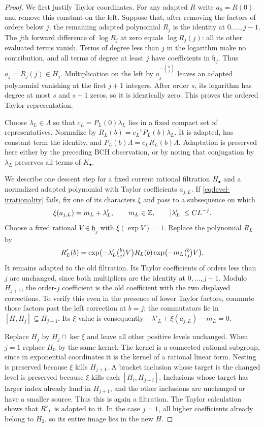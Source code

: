 \begin{proof}
We first justify Taylor coordinates.  For any adapted $R$ write
$a_0=R(0)$ and remove this constant on the left.  Suppose that, after
removing the factors of orders below $j$, the remaining adapted polynomial
$R_j$ is the identity at $0,\ldots,j-1$.  The $j$th forward difference of
$\log R_j$ at zero equals $\log R_j(j)$: all its other evaluated terms
vanish.  Terms of degree less than $j$ in the logarithm make no
contribution, and all terms of degree at least $j$ have coefficients in
$\mathfrak h_j$.  Thus $a_j=R_j(j)\in H_j$.  Multiplication on the left by
$a_j^{-\binom bj}$ leaves an adapted polynomial vanishing at the first
$j+1$ integers.  After order $s$, its logarithm has degree at most $s$
and $s+1$ zeros, so it is identically zero.  This proves the ordered Taylor
representation.

Choose $\lambda_L\in\Lambda$ so that
$c_L=P_L(0)\lambda_L$ lies in a fixed compact set of representatives.
Normalize by
$R_L(b)=c_L^{-1}P_L(b)\lambda_L$.
It is adapted, has constant term the identity, and
$P_L(b)\Lambda=c_LR_L(b)\Lambda$.  Adaptation is preserved here either
by the preceding BCH observation, or by noting that conjugation by
$\lambda_L$ preserves all terms of $K_\bullet$.

We describe one descent step for a fixed current rational filtration
$H_\bullet$ and a normalized adapted polynomial with Taylor coefficients
$a_{j,L}$.  If \eqref{eq:level-irrationality} fails, fix one of its
characters $\xi$ and pass to a subsequence on which
\[
 \xi(a_{j,L})=m_L+\lambda'_L,\qquad
 m_L\in\mathbb Z,\qquad \lvert\lambda'_L\rvert\leq C L^{-j}.
\]
Choose a fixed rational $V\in\mathfrak h_j$ with $\xi(\exp V)=1$.
Replace the polynomial $R_L$ by
\begin{equation}
 R'_L(b)
 =\exp\bigl(-\lambda'_L\tbinom bj V\bigr)
   R_L(b)
   \exp\bigl(-m_L\tbinom bj V\bigr).
 \label{eq:filtration-descent}
\end{equation}
It remains adapted to the old filtration.  Its Taylor coefficients of
orders less than $j$ are unchanged, since both multipliers are the
identity at $0,\ldots,j-1$.  Modulo $H_{j+1}$, the order-$j$ coefficient
is the old coefficient with the two displayed corrections.  To verify this
even in the presence of lower Taylor factors, commute those factors past
the left correction at $b=j$; the commutators lie in
$[H,H_j]\subseteq H_{j+1}$.  Its $\xi$-value is consequently
$-\lambda'_L+\xi(a_{j,L})-m_L=0$.

Replace $H_j$ by $H_j\cap\ker\xi$ and leave all other positive levels
unchanged.  When $j=1$ replace $H_0$ by the same kernel.  The kernel is a
connected rational subgroup, since in exponential coordinates it is the
kernel of a rational linear form.  Nesting is preserved because $\xi$
kills $H_{j+1}$.  A bracket inclusion whose target is the changed level
is preserved because $\xi$ kills each $[H_i,H_{j-i}]$.  Inclusions whose
target has larger index already land in $H_{j+1}$, and the other
inclusions are unchanged or have a smaller source.  Thus this is again a
filtration.  The Taylor calculation shows that $R'_L$ is adapted to it.
In the case $j=1$, all higher coefficients already belong to $H_2$,
so its entire image lies in the new $H$.


\end{proof}
